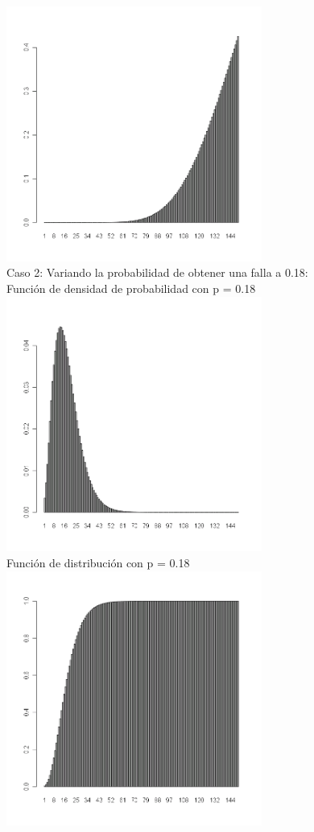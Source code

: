 \begin{itemize}
  	  \includegraphics[width=3.3in,height=3.3in]{images/1_3-pnbinom16.png}\\
	Caso 2: Variando la probabilidad de obtener una falla a 0.18:\\
	Funci\'on de densidad de probabilidad con p = 0.18 \\
  	  \includegraphics[width=3.3in,height=3.3in]{images/1_3-dnbinom018.png}\\
	Funci\'on de distribuci\'on con p = 0.18\\
  	  \includegraphics[width=3.3in,height=3.3in]{images/1_3-pnbinom018.png}\\


\end{itemize}
